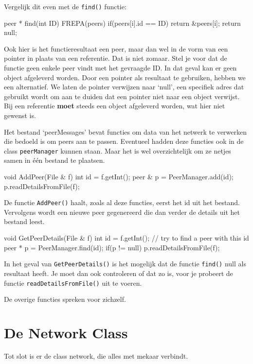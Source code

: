 Vergelijk dit even met de \texttt{find()} functie:

\begin{code}
peer * find(int ID) 
{
	FREPA(peers)
	{
		 if(peers[i].id == ID)
		 {
				return &peers[i];
		 }
	}	
	return null;
}
\end{code}

Ook hier is het functieresultaat een peer, maar dan wel in de vorm van een pointer in plaats van een referentie. Dat is niet zomaar. Stel je voor dat de functie geen enkele peer vindt met het gevraagde ID. In dat geval kan er geen object afgeleverd worden. Door een pointer als resultaat te gebruiken, hebben we een alternatief. We laten de pointer verwijzen naar `null', een specifiek adres dat gebruikt wordt om aan te duiden dat een pointer niet naar een object verwijst. Bij een referentie \textbf{moet} steeds een object afgeleverd worden, wat hier niet gewenst is.

Het bestand `peerMessages' bevat functies om data van het netwerk te verwerken die bedoeld is om peers aan te passen. Eventueel hadden deze functies ook in de class \texttt{peerManager} kunnen staan. Maar het is wel overzichtelijk om ze netjes samen in \'e\'en bestand te plaatsen.

\begin{code}
void AddPeer(File & f)
{
   int id = f.getInt();
   peer & p = PeerManager.add(id);
   p.readDetailsFromFile(f);
}
\end{code}

De functie \texttt{AddPeer()} haalt, zoals al deze functies, eerst het id uit het bestand. Vervolgens wordt een nieuwe peer gegenereerd die dan verder de details uit het bestand leest.

\begin{code}
void GetPeerDetails(File & f)
{
   int id = f.getInt();
   // try to find a peer with this id
   peer * p = PeerManager.find(id);
   if(p != null)
   {
      p.readDetailsFromFile(f);
   }
}
\end{code}

In het geval van \texttt{GetPeerDetails()} is het mogelijk dat de functie \texttt{find()} null als resultaat heeft. Je moet dan ook controleren of dat zo is, voor je probeert de functie \texttt{readDetailsFromFile()} uit te voeren.

De overige functies spreken voor zichzelf.

\section{De Network Class}
Tot slot is er de class network, die alles met mekaar verbindt. 

